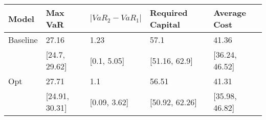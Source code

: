 \begin{tabular}{lllll}
\toprule
   Model &        Max VaR & $|VaR_2 - VaR_1|$ & Required Capital &   Average Cost \\
\midrule
Baseline &          27.16 &              1.23 &             57.1 &          41.36 \\
         &  [24.7, 29.62] &       [0.1, 5.05] &    [51.16, 62.9] & [36.24, 46.52] \\
     Opt &          27.71 &               1.1 &            56.51 &          41.31 \\
         & [24.91, 30.31] &      [0.09, 3.62] &   [50.92, 62.26] & [35.98, 46.82] \\
\bottomrule
\end{tabular}
